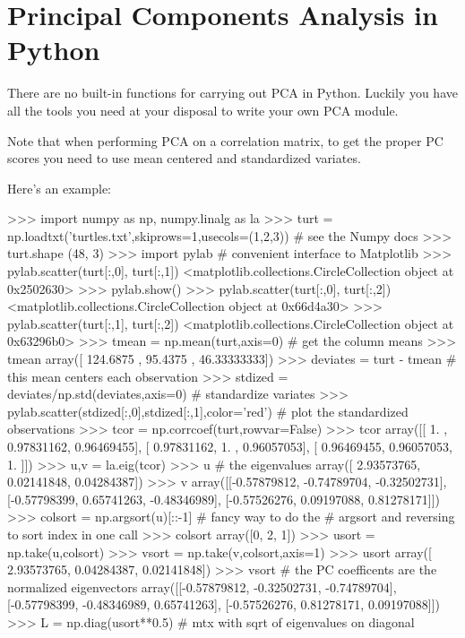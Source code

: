 \section{Principal Components Analysis in Python}

There are no built-in functions for carrying out PCA in Python. Luckily
you have all the tools you need at your disposal to write your own PCA
module.

Note that when performing PCA on a correlation matrix, to get the proper
PC scores you need to use mean centered and standardized variates.

Here's an example:

\begin{python}
>>> import numpy as np, numpy.linalg as la
>>> turt = np.loadtxt('turtles.txt',skiprows=1,usecols=(1,2,3)) # see the Numpy docs
>>> turt.shape
(48, 3)
>>> import pylab # convenient interface to Matplotlib
>>> pylab.scatter(turt[:,0], turt[:,1])
<matplotlib.collections.CircleCollection object at 0x2502630>
>>> pylab.show()
>>> pylab.scatter(turt[:,0], turt[:,2])
<matplotlib.collections.CircleCollection object at 0x66d4a30>
>>> pylab.scatter(turt[:,1], turt[:,2])
<matplotlib.collections.CircleCollection object at 0x63296b0>
>>> tmean = np.mean(turt,axis=0) # get the column means
>>> tmean
array([ 124.6875    ,   95.4375    ,   46.33333333])
>>> deviates = turt - tmean # this mean centers each observation
>>> stdized = deviates/np.std(deviates,axis=0) # standardize variates
>>> pylab.scatter(stdized[:,0],stdized[:,1],color='red') # plot the standardized observations
>>> tcor = np.corrcoef(turt,rowvar=False)
>>> tcor
array([[ 1.        ,  0.97831162,  0.96469455],
       [ 0.97831162,  1.        ,  0.96057053],
       [ 0.96469455,  0.96057053,  1.        ]])
>>> u,v = la.eig(tcor)
>>> u # the eigenvalues
array([ 2.93573765,  0.02141848,  0.04284387])
>>> v  
array([[-0.57879812, -0.74789704, -0.32502731],
       [-0.57798399,  0.65741263, -0.48346989],
       [-0.57526276,  0.09197088,  0.81278171]])
>>> colsort = np.argsort(u)[::-1] # fancy way  to do the 
                  # argsort and reversing to sort index in one call
>>> colsort
array([0, 2, 1])
>>> usort = np.take(u,colsort)
>>> vsort = np.take(v,colsort,axis=1)
>>> usort
array([ 2.93573765,  0.04284387,  0.02141848])
>>> vsort # the PC coefficents are the normalized eigenvectors
array([[-0.57879812, -0.32502731, -0.74789704],
       [-0.57798399, -0.48346989,  0.65741263],
       [-0.57526276,  0.81278171,  0.09197088]])
>>> L = np.diag(usort**0.5) # mtx with sqrt of eigenvalues on diagonal

\end{python}
